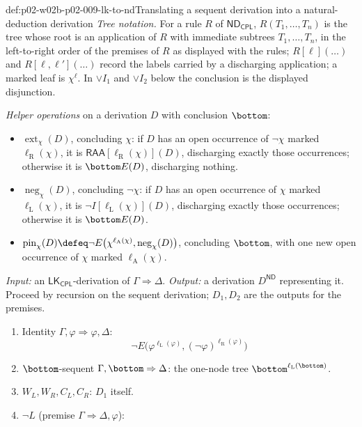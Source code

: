 \begin{hbmethod}{def:p02-w02b-p02-009-lk-to-nd}{Translating a sequent derivation into a natural-deduction derivation}
\emph{Tree notation.}  For a rule \(R\) of \(\mathsf{ND}_{\mathsf{CPL}}\),
\(R(T_1,\ldots,T_n)\) is the tree whose root is an application of \(R\)
with immediate subtrees \(T_1,\ldots,T_n\), in the left-to-right order of the
premises of \(R\) as displayed with the rules; \(R[\ell](\ldots)\) and
\(R[\ell,\ell'](\ldots)\) record the labels carried by a discharging
application; a marked leaf is \(\chi^{\ell}\).  In \(\lor I_1\) and
\(\lor I_2\) below the conclusion is the displayed disjunction.

\emph{Helper operations} on a derivation \(D\) with conclusion \(\bottom\):
\begin{itemize}
  \item \(\operatorname{ext}_\chi(D)\), concluding \(\chi\): if \(D\) has an
    open occurrence of \(\neg\chi\) marked \(\ell_{\mathrm R}(\chi)\), it is
    \(\mathsf{RAA}[\ell_{\mathrm R}(\chi)](D)\), discharging exactly those
    occurrences; otherwise it is \(\bottom E(D)\), discharging nothing.
  \item \(\operatorname{neg}_\chi(D)\), concluding \(\neg\chi\): if \(D\)
    has an open occurrence of \(\chi\) marked \(\ell_{\mathrm L}(\chi)\), it
    is \(\neg I[\ell_{\mathrm L}(\chi)](D)\), discharging exactly those
    occurrences; otherwise it is \(\bottom E(D)\).
  \item \(\operatorname{pin}_\chi(D)\defeq
    \neg E\bigl(\chi^{\ell_{\mathrm A}(\chi)},\operatorname{neg}_\chi(D)\bigr)\),
    concluding \(\bottom\), with one new open occurrence of \(\chi\) marked
    \(\ell_{\mathrm A}(\chi)\).
\end{itemize}
\emph{Input:} an \(\mathsf{LK}_{\mathsf{CPL}}\)-derivation of
\(\Gamma\Rightarrow\Delta\).  \emph{Output:} a derivation \(D^{\mathsf{ND}}\)
representing it.  Proceed by recursion on the sequent derivation; \(D_1,D_2\)
are the outputs for the premises.
\begin{enumerate}
  \item Identity \(\Gamma,\varphi\Rightarrow\varphi,\Delta\):
    \[\neg E\bigl(\varphi^{\ell_{\mathrm L}(\varphi)},
    (\neg\varphi)^{\ell_{\mathrm R}(\varphi)}\bigr)\]
  \item \(\bottom\)-sequent \(\Gamma,\bottom\Rightarrow\Delta\): the one-node
    tree \(\bottom^{\ell_{\mathrm L}(\bottom)}\).
  \item \(W_L,W_R,C_L,C_R\): \(D_1\) itself.
  \item \(\neg L\) (premise \(\Gamma\Rightarrow\Delta,\varphi\)):

\end{enumerate}
\end{hbmethod}
